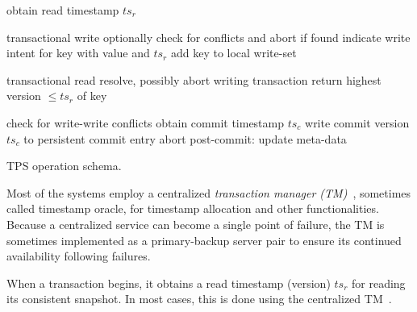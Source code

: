
\begin{algorithm}[tb]
\begin{algorithmic}[1]
{}
\State obtain read timestamp $ts_r$ 
\EndProcedure

 \Comment transactional write
\State optionally check for conflicts and abort if found 
\State indicate write intent for key with value and $ts_r$
\State add key to local write-set
\EndProcedure

 \Comment transactional read
	\State resolve, possibly abort writing transaction \label{l:resolve}
\EndIf
\State return highest version   $\le ts_r$ of key
\EndProcedure


\Statex \Comment check for write-write conflicts  \label{l:validate}
\State obtain commit timestamp $ts_c$
	\State write commit  version $ts_c$ to persistent commit entry \label{l:commit}
\Else
	\State abort	
\EndIf
\State post-commit: update meta-data
\EndProcedure

\end{algorithmic}
\caption{TPS operation schema.} 
\label{alg:schema}
\end{algorithm} 

Most of the systems employ a centralized \emph{transaction manager (TM)}~\cite{Percolator2010,OmidICDE2014,Omid2017,tephra},
 sometimes called timestamp oracle, for timestamp allocation and other functionalities. 
 Because a centralized service can become a single point of failure, the TM is sometimes implemented
 as a primary-backup server pair to ensure its continued availability following failures.

  When a transaction begins, it obtains a read timestamp (version) $ts_r$ for reading its consistent snapshot.
 In most cases, this is done using the centralized TM~\cite{Percolator2010,OmidICDE2014,Omid2017,tephra}. 

